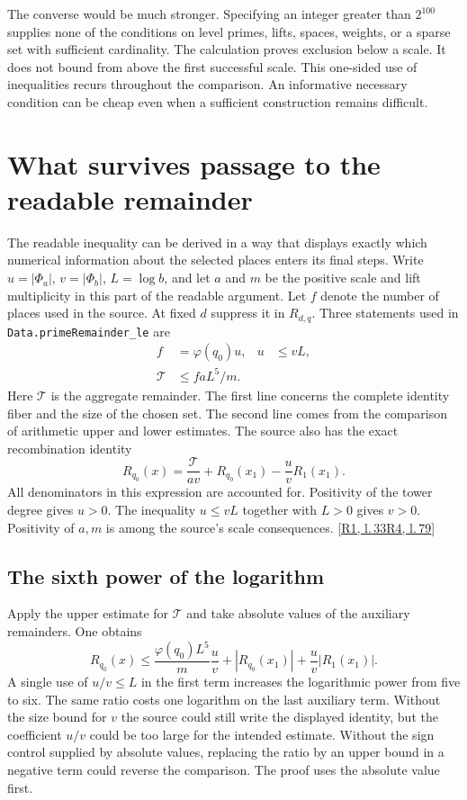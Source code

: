 \documentclass[12pt,letterpaper]{article}
\newcommand{\id}[1]{{\small\nolinkurl{#1}}}
\begin{document}
The converse would be much stronger. Specifying an integer greater than $2^{100}$ supplies none of the conditions on level primes, lifts, spaces, weights, or a sparse set with sufficient cardinality. The calculation proves exclusion below a scale. It does not bound from above the first successful scale. This one-sided use of inequalities recurs throughout the comparison. An informative necessary condition can be cheap even when a sufficient construction remains difficult.

\section{What survives passage to the readable remainder}\label{sec:reduce}
The readable inequality can be derived in a way that displays exactly which numerical information about the selected places enters its final steps. Write $u=|\Phi_a|$, $v=|\Phi_b|$, $L=\log b$, and let $a$ and $m$ be the positive scale and lift multiplicity in this part of the readable argument. Let $f$ denote the number of places used in the source. At fixed $d$ suppress it in $R_{d,q}$. Three statements used in \id{Data.primeRemainder_le} are
\begin{align*}
  f&=\varphi(q_0)u, & u&\le vL,\\
  \mathcal T&\le f a L^5/m .
\end{align*}
Here $\mathcal T$ is the aggregate remainder. The first line concerns the complete identity fiber and the size of the chosen set. The second line comes from the comparison of arithmetic upper and lower estimates. The source also has the exact recombination identity
\[
 R_{q_0}(x)=\frac{\mathcal T}{av}+R_{q_0}(x_1)
                        -\frac{u}{v}R_1(x_1).
\]
All denominators in this expression are accounted for. Positivity of the tower degree gives $u>0$. The inequality $u\le vL$ together with $L>0$ gives $v>0$. Positivity of $a,m$ is among the source's scale consequences.  {\footnotesize\sffamily\color{mute}[\href{https://github.com/leanprover-community/riemann-hypothesis/blob/e063a923620ee7787b4a1270421478645bf66bdb/src/New/Reduction/OneSidedBound.lean\#L33}{R1, l.\,33}\enspace \href{https://github.com/leanprover-community/riemann-hypothesis/blob/e063a923620ee7787b4a1270421478645bf66bdb/src/New/Reduction/PrimeSums.lean\#L79}{R4, l.\,79}]}

\subsection{The sixth power of the logarithm}
Apply the upper estimate for $\mathcal T$ and take absolute values of the auxiliary remainders. One obtains
\[
 R_{q_0}(x)\le
   \frac{\varphi(q_0)L^5}{m}\frac uv
   +|R_{q_0}(x_1)|+\frac uv|R_1(x_1)|.
\]
A single use of $u/v\le L$ in the first term increases the logarithmic power from five to six. The same ratio costs one logarithm on the last auxiliary term. Without the size bound for $v$ the source could still write the displayed identity, but the coefficient $u/v$ could be too large for the intended estimate. Without the sign control supplied by absolute values, replacing the ratio by an upper bound in a negative term could reverse the comparison. The proof uses the absolute value first.
\end{document}
